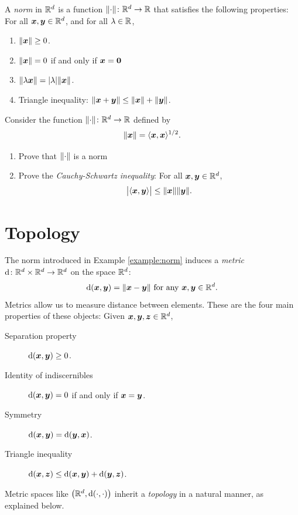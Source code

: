 \begin{example}[Norms]\label{example:norm}
A \emph{norm} in $\mathbb{R}^d$ is a function $\lVert \cdot \rVert \colon \mathbb{R}^d \to \mathbb{R}$ that satisfies the following properties:
For all $\boldsymbol{x}, \boldsymbol{y} \in \mathbb{R}^d$, and for all $\lambda \in \mathbb{R}$,
\begin{enumerate}
	\item $\lVert \boldsymbol{x} \rVert \geq 0$.
	\item $\lVert \boldsymbol{x} \rVert = 0$ if and only if $\boldsymbol{x} = \boldsymbol{0}$
	\item $\lVert  \lambda \boldsymbol{x} \rVert = \lvert \lambda \rvert \lVert \boldsymbol{x} \rVert$.
	\item Triangle inequality: $\lVert \boldsymbol{x} + \boldsymbol{y} \rVert \leq \lVert \boldsymbol{x} \rVert + \lVert \boldsymbol{y} \rVert$.
\end{enumerate}
\end{example}

\begin{problem}\label{problem:norm}
Consider the function $\lVert \cdot \rVert \colon \mathbb{R}^d \to \mathbb{R}$ defined by 
\begin{equation*}
\lVert \boldsymbol{x} \rVert = \langle \boldsymbol{x}, \boldsymbol{x} \rangle^{1/2}.
\end{equation*}
\begin{enumerate}
	\item Prove that $\lVert \cdot \rVert$ is a norm
	\item Prove the \emph{Cauchy-Schwartz inequality}: For all $\boldsymbol{x}, \boldsymbol{y} \in \mathbb{R}^d$, 
	\begin{equation*}
	\big\lvert \langle \boldsymbol{x}, \boldsymbol{y} \rangle \big\rvert \leq \lVert \boldsymbol{x} \rVert \lVert \boldsymbol{y} \rVert.
	\end{equation*}
\end{enumerate}
\end{problem}


\section{Topology}
The norm introduced in Example \ref{example:norm} induces a \emph{metric} $\operatorname{d} \colon \mathbb{R}^d \times \mathbb{R}^d \to \mathbb{R}^d$ on the space $\mathbb{R}^d$: 
\begin{equation*}
\operatorname{d}(\boldsymbol{x},\boldsymbol{y}) = \lVert \boldsymbol{x} - \boldsymbol{y} \rVert \text{ for any }\boldsymbol{x}, \boldsymbol{y} \in \mathbb{R}^d.
\end{equation*}
Metrics allow us to measure distance between elements.  These are the four main properties of these objects:  Given $\boldsymbol{x}, \boldsymbol{y}, \boldsymbol{z} \in \mathbb{R}^d$,
\begin{description}
	\item[Separation property] $\operatorname{d}(\boldsymbol{x},\boldsymbol{y}) \geq 0$.
	\item[Identity of indiscernibles] $\operatorname{d}(\boldsymbol{x}, \boldsymbol{y}) = 0$ if and only if $\boldsymbol{x} = \boldsymbol{y}$.
	\item[Symmetry] $\operatorname{d}(\boldsymbol{x}, \boldsymbol{y}) = \operatorname{d}(\boldsymbol{y}, \boldsymbol{x})$.
	\item[Triangle inequality] $\operatorname{d}(\boldsymbol{x},\boldsymbol{z}) \leq \operatorname{d}(\boldsymbol{x},\boldsymbol{y}) + \operatorname{d}(\boldsymbol{y},\boldsymbol{z})$. 
\end{description}
Metric spaces like $\big( \mathbb{R}^d, \operatorname{d}(\cdot,\cdot) \big)$ inherit a \emph{topology} in a natural manner, as explained below.

